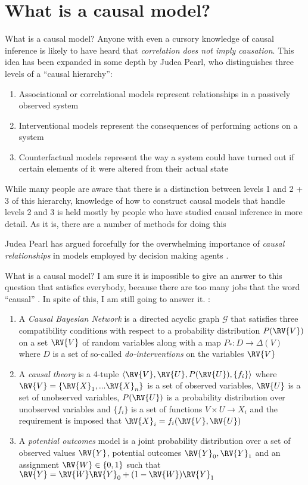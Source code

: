 

\section{What is a causal model?}

What is a causal model? Anyone with even a cursory knowledge of causal inference is likely to have heard that \emph{correlation does not imply causation}. This idea has been expanded in some depth by Judea Pearl, who distinguishes three levels of a ``causal hierarchy'':

\begin{enumerate}
	\item Associational or correlational models represent relationships in a passively observed system
	\item Interventional models represent the consequences of performing actions on a system
	\item Counterfactual models represent the way a system could have turned out if certain elements of it were altered from their actual state
\end{enumerate}

While many people are aware that there is a distinction between levels 1 and 2 + 3 of this hierarchy, knowledge of how to construct causal models that handle levels 2 and 3 is held mostly by people who have studied causal inference in more detail. As it is, there are a number of methods for doing this


Judea Pearl has argued forcefully for the overwhelming importance of \emph{causal relationships} in models employed by decision making agents \cite{pearl_book_2018}. 

What is a causal model? I am sure it is impossible to give an answer to this question that satisfies everybody, because there are too many jobs that the word ``causal'' . In spite of this, I am still going to answer it.  :
\begin{enumerate}
	\item A \emph{Causal Bayesian Network} is a directed acyclic graph $\mathcal{G}$ that satisfies three compatibility conditions with respect to a probability distribution $P(\RV{V})$ on a set $\RV{V}$ of random variables along with a map $P_*:D\to \Delta(V)$ where $D$ is a set of so-called \emph{do-interventions} on the variables $\RV{V}$ \citep{pearl_causality:_2009}
	\item A \emph{causal theory} is a 4-tuple $\langle \RV{V}, \RV{U}, P(\RV{U}), \{f_i\}\rangle$ where $\RV{V}=\{\RV{X}_1,...\RV{X}_n\}$ is a set of observed variables, $\RV{U}$ is a set of unobserved variables, $P(\RV{U})$ is a probability distribution over unobserved variables and $\{f_i\}$ is a set of functions $V\times U\to X_i$ and the requirement is imposed that $\RV{X}_i = f_i(\RV{V},\RV{U})$ \cite{galles_testing_1995}
	\item A \emph{potential outcomes} model is a joint probability distribution over a set of observed values $\RV{Y}$, potential outcomes $\RV{Y}_0, \RV{Y}_1$ and an assignment $\RV{W}\in\{0,1\}$ such that $\RV{Y}=\RV{W}\RV{Y}_0 + (1-\RV{W})\RV{Y}_1$ \cite{rubin_causal_2005}
\end{enumerate}
	


